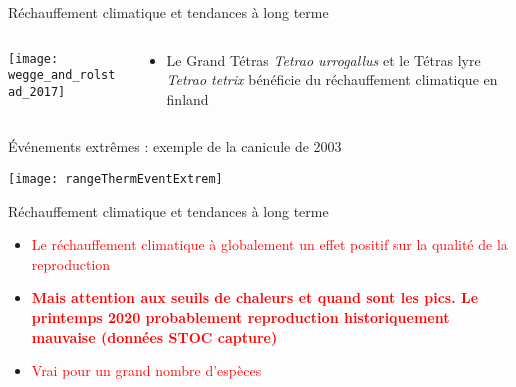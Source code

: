\documentclass[10pt]{beamer}
\begin{document}
\begin{frame}{Réchauffement climatique et tendances à long terme}
  \begin{columns}[c]
    \begin{column}[c]{0.5\textwidth}
      \begin{center}
   \texttt{[image: wegge\_and\_rolstad\_2017]}\\
 \end{center}
    \end{column}
    \begin{column}[c]{0.5\textwidth}
   
    \begin{itemize}
    \item <2> Le Grand Tétras \textit{Tetrao urrogallus} et le Tétras lyre \textit{Tetrao tetrix} bénéficie du réchauffement climatique en finland
    
   \end{itemize}
    
    \end{column}
  \end{columns}

   \begin{tiny}
    \cite{Wegge2017}
  \end{tiny}

\end{frame}



\begin{frame}{Événements extrêmes : \small{exemple de la canicule de 2003}}
  \begin{center}
   \texttt{[image: rangeThermEventExtrem]}
  \end{center}
  \end{frame}

  
  
\begin{frame}{Réchauffement climatique et tendances à long terme}
 
    \begin{itemize}
    \item  \textcolor{red}{Le réchauffement climatique à globalement un effet positif sur la qualité de la reproduction}
    \item \textcolor{red}{\textbf{Mais attention aux seuils de chaleurs et quand sont les pics. Le printemps 2020 probablement reproduction historiquement mauvaise (données STOC capture)}}
     \item \textcolor{red}{Vrai pour un grand nombre d'espèces}
    
   \end{itemize}
  
\end{frame}
  
\end{document}
